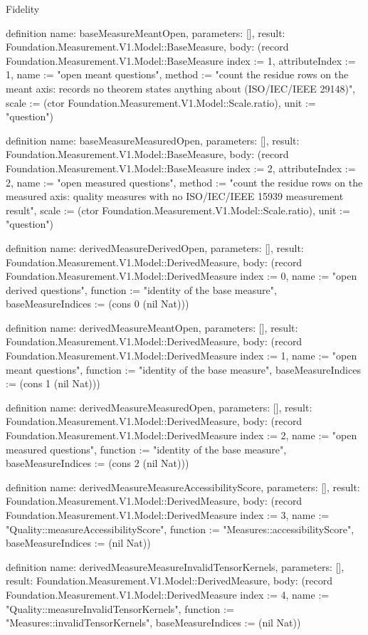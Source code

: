 \begin{lexlean}{Fidelity}
\begin{semanticmodule}
definition{
  name: baseMeasureMeantOpen,
  parameters: [],
  result: Foundation.Measurement.V1.Model::BaseMeasure,
  body: (record Foundation.Measurement.V1.Model::BaseMeasure {index := 1, attributeIndex := 1, name := "open meant questions", method := "count the residue rows on the meant axis: records no theorem states anything about (ISO/IEC/IEEE 29148)", scale := (ctor Foundation.Measurement.V1.Model::Scale.ratio), unit := "question"})
}

definition{
  name: baseMeasureMeasuredOpen,
  parameters: [],
  result: Foundation.Measurement.V1.Model::BaseMeasure,
  body: (record Foundation.Measurement.V1.Model::BaseMeasure {index := 2, attributeIndex := 2, name := "open measured questions", method := "count the residue rows on the measured axis: quality measures with no ISO/IEC/IEEE 15939 measurement result", scale := (ctor Foundation.Measurement.V1.Model::Scale.ratio), unit := "question"})
}

definition{
  name: derivedMeasureDerivedOpen,
  parameters: [],
  result: Foundation.Measurement.V1.Model::DerivedMeasure,
  body: (record Foundation.Measurement.V1.Model::DerivedMeasure {index := 0, name := "open derived questions", function := "identity of the base measure", baseMeasureIndices := (cons 0 (nil Nat))})
}

definition{
  name: derivedMeasureMeantOpen,
  parameters: [],
  result: Foundation.Measurement.V1.Model::DerivedMeasure,
  body: (record Foundation.Measurement.V1.Model::DerivedMeasure {index := 1, name := "open meant questions", function := "identity of the base measure", baseMeasureIndices := (cons 1 (nil Nat))})
}

definition{
  name: derivedMeasureMeasuredOpen,
  parameters: [],
  result: Foundation.Measurement.V1.Model::DerivedMeasure,
  body: (record Foundation.Measurement.V1.Model::DerivedMeasure {index := 2, name := "open measured questions", function := "identity of the base measure", baseMeasureIndices := (cons 2 (nil Nat))})
}

definition{
  name: derivedMeasureMeasureAccessibilityScore,
  parameters: [],
  result: Foundation.Measurement.V1.Model::DerivedMeasure,
  body: (record Foundation.Measurement.V1.Model::DerivedMeasure {index := 3, name := "Quality::measureAccessibilityScore", function := "Measures::accessibilityScore", baseMeasureIndices := (nil Nat)})
}

definition{
  name: derivedMeasureMeasureInvalidTensorKernels,
  parameters: [],
  result: Foundation.Measurement.V1.Model::DerivedMeasure,
  body: (record Foundation.Measurement.V1.Model::DerivedMeasure {index := 4, name := "Quality::measureInvalidTensorKernels", function := "Measures::invalidTensorKernels", baseMeasureIndices := (nil Nat)})
}


\end{semanticmodule}
\end{lexlean}
